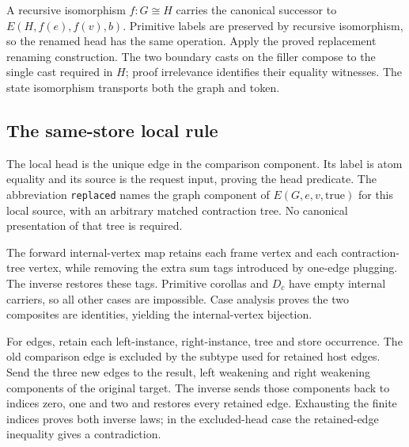 

A recursive isomorphism $f:G\cong H$ carries the canonical successor to
$E(H,f(e),f(v),b)$. Primitive labels are preserved by recursive isomorphism,
so the renamed head has the same operation. Apply the proved replacement
renaming construction. The two boundary casts on the filler compose to the
single cast required in $H$; proof irrelevance identifies their equality
witnesses. The state isomorphism transports both the graph and token.


\subsection{The same-store local rule}

The local head is the unique edge in the comparison component. Its label
is atom equality and its source is the request input, proving the head
predicate. The abbreviation \texttt{replaced} names the graph component of
$E(G,e,v,\mathrm{true})$ for this local source, with an arbitrary matched
contraction tree. No canonical presentation of that tree is required.




The forward internal-vertex map retains each frame vertex and each
contraction-tree vertex, while removing the extra sum tags introduced by
one-edge plugging. The inverse restores these tags. Primitive corollas and
$D_c$ have empty internal carriers, so all other cases are impossible.
Case analysis proves the two composites are identities, yielding the
internal-vertex bijection.




For edges, retain each left-instance, right-instance, tree and store
occurrence. The old comparison edge is excluded by the subtype used for
retained host edges. Send the three new edges to the result, left weakening
and right weakening components of the original target. The inverse sends
those components back to indices zero, one and two and restores every
retained edge. Exhausting the finite indices proves both inverse laws;
in the excluded-head case the retained-edge inequality gives a contradiction.

